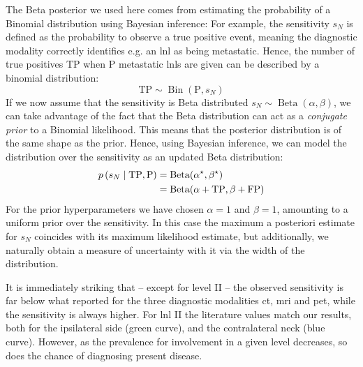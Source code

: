 \documentclass[\relativeRoot/main.tex]{subfiles}
\begin{document}
\begin{tcolorbox}[
    title=\faIcon{lightbulb} Beta posterior,
    parbox=false,
    float
] \label{box:dataset_clb:results:beta}
    The Beta posterior we used here comes from estimating the probability of a Binomial distribution using Bayesian inference: For example, the sensitivity $s_N$ is defined as the probability to observe a true positive event, meaning the diagnostic modality correctly identifies e.g. an \gls{lnl} as being metastatic. Hence, the number of true positives TP when P metastatic \glspl{lnl} are given can be described by a binomial distribution:
    \begin{equation}
        \text{TP} \sim \operatorname{Bin}(\text{P}, s_N)
    \end{equation}
    If we now assume that the sensitivity is Beta distributed $s_N \sim \operatorname{Beta}(\alpha, \beta)$, we can take advantage of the fact that the Beta distribution can act as a \emph{conjugate prior} to a Binomial likelihood. This means that the posterior distribution is of the same shape as the prior. Hence, using Bayesian inference, we can model the distribution over the sensitivity as an updated Beta distribution:
    \begin{equation}
        \begin{aligned}
            p \left( s_N \mid \text{TP},\text{P} \right) &= \operatorname{Beta}(\alpha^\star, \beta^\star) \\
            &= \operatorname{Beta}(\alpha + \text{TP}, \beta + \text{FP})
        \end{aligned}
    \end{equation}
    For the prior hyperparameters we have chosen $\alpha=1$ and $\beta=1$, amounting to a uniform prior over the sensitivity. In this case the maximum a posteriori estimate for $s_N$ coincides with its maximum likelihood estimate, but additionally, we naturally obtain a measure of uncertainty with it via the width of the distribution.

\end{tcolorbox}

It is immediately striking that -- except for level II -- the observed sensitivity is far below what  reported for the three diagnostic modalities \gls{ct}, \gls{mri} and \gls{pet}, while the sensitivity is always higher. For \gls{lnl} II the literature values match our results, both for the ipsilateral side (green curve), and the contralateral neck (blue curve). However, as the prevalence for involvement in a given level decreases, so does the chance of diagnosing present disease.
\end{document}
